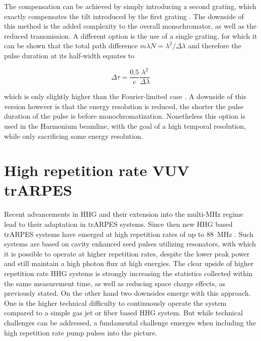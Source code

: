 The compensation can be achieved by simply introducing a second grating, which exactly compensates the tilt introduced by the first grating \cite{villoresi_compensation_1999}.
The downside of this method is the added complexity to the overall monochromator, as well as the reduced transmission.
A different option is the use of a single grating, for which it can be shown that the total path difference $m\lambda N=\lambda^2/\Delta\lambda$ \cite{samson_j_a_vacuum_1998} and therefore the pulse duration at its half-width equates to

\begin{equation}
	\Delta\tau = \frac{0.5}{c}\frac{\lambda^2}{\Delta\lambda}
\end{equation}

which is only slightly higher than the Fourier-limited case \cite{poletto_time-preserving_2010,nugent-glandorf_laser-based_2002,poletto_time-compensated_2004,poletto_time-delay_2006}.
A downside of this version however is that the energy resolution is reduced, the shorter the pulse duration of the pulse is before monochromatization.
Nonetheless this option is used in the Harmonium beamline, with the goal of a high temporal resolution, while only sacrificing some energy resolution.

\section{High repetition rate VUV trARPES}
\label{sec:high_rep_vuv}

Recent advancements in HHG and their extension into the multi-\unit{\mega\hertz} regime \cite{mills_xuv_2012,hadrich_high_2014,pronin_high-power_2015,saraceno_toward_2015,hadrich_single-pass_2016,carstens_high-harmonic_2016,zhao_efficient_2018} lead to their adaptation in trARPES systems.
Since then new HHG based trARPES systems have emerged at high repetition rates of up to \qty{88}{\mega\hertz} \cite{corder_ultrafast_2018,mills_cavity-enhanced_2019}.
Such systems are based on cavity enhanced seed pulses utilizing resonators, with which it is possible to operate at higher repetition rates, despite the lower peak power and still maintain a high photon flux at high energies.
The clear upside of higher repetition rate HHG systems is strongly increasing the statistics collected within the same measurement time, as well as reducing space charge effects, as previously stated.
On the other hand two downsides emerge with this approach.
One is the higher technical difficulty to continuously operate the system compared to a simple gas jet or fiber based HHG system.
But while technical challenges can be addressed, a fundamental challenge emerges when including the high repetition rate pump pulses into the picture.

